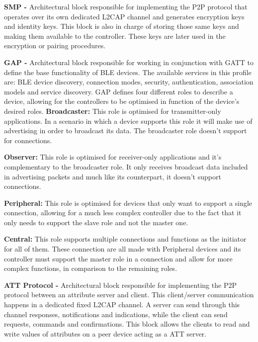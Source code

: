 \textbf{\ac{SMP} -} Architectural block responsible for implementing the \ac{P2P} protocol that operates over its own dedicated \ac{L2CAP} channel and generates encryption keys and identity keys. This block is also in charge of storing those same keys and making them available to the controller. These keys are later used in the encryption or pairing procedures.


\textbf{\ac{GAP} -} Architectural block responsible for working in conjunction with \ac{GATT} to define the base functionality of \ac{BLE} devices. The available services in this profile are: \ac{BLE} device discovery, connection modes, security, authentication, association models and service discovery.
\ac{GAP} defines four different roles to describe a device, allowing for the controllers to be optimised in function of the device's desired roles.
\tab \textbf{Broadcaster:} This role is optimised for transmitter-only applications. In a scenario in which a device supports this role it will make use of advertising in order to broadcast its data. The broadcaster role doesn't support for connections.
 
 
\tab \textbf{Observer:} This role is optimised for receiver-only applications and it's complementary to the broadcaster role. It only receives broadcast data included in advertising packets and much like its counterpart, it doesn't support connections.
 

\tab \textbf{Peripheral:} This role is optimised for devices that only want to support a single connection, allowing for a much less complex controller due to the fact that it only needs to support the slave role and not the master one.


\tab \textbf{Central:} This role supports multiple connections and functions as the initiator for all of them. These connection are all made with Peripheral devices and its controller must support the master role in a connection and allow for more complex functions, in comparison to the remaining roles.


\textbf{\ac{ATT} Protocol -} Architectural block responsible for implementing the \ac{P2P} protocol between an attribute server and client. This client/server communication happens in a dedicated fixed \ac{L2CAP} channel. A server can send through this channel responses, notifications and indications, while the client can send requests, commands and confirmations. This block allows the clients to read and write values of attributes on a peer device acting as a \ac{ATT} server.


